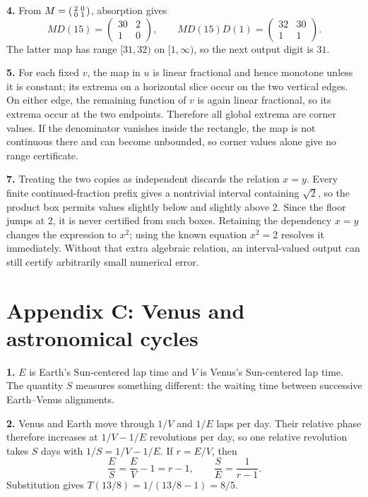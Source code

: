 \textbf{4.} From $M=\begin{psmallmatrix}2&0\\0&1\end{psmallmatrix}$,
absorption gives
\[
 MD(15)=\begin{pmatrix}30&2\\1&0\end{pmatrix},
 \qquad
 MD(15)D(1)=\begin{pmatrix}32&30\\1&1\end{pmatrix}.
\]
The latter map has range $[31,32)$ on $[1,\infty)$, so the next output digit
is $31$.

\textbf{5.} For each fixed $v$, the map in $u$ is linear fractional and hence
monotone unless it is constant; its extrema on a horizontal slice occur on the
two vertical edges.  On either edge, the remaining function of $v$ is again
linear fractional, so its extrema occur at the two endpoints.  Therefore all
global extrema are corner values.  If the denominator vanishes inside the
rectangle, the map is not continuous there and can become unbounded, so corner
values alone give no range certificate.

\textbf{7.} Treating the two copies as independent discards the relation
$x=y$.  Every finite continued-fraction prefix gives a nontrivial interval
containing $\sqrt2$, so the product box permits values slightly below and
slightly above $2$.  Since the floor jumps at $2$, it is never certified from
such boxes.  Retaining the dependency $x=y$ changes the expression to $x^2$;
using the known equation $x^2=2$ resolves it immediately.  Without that extra
algebraic relation, an interval-valued output can still certify arbitrarily
small numerical error.

\section*{Appendix C: Venus and astronomical cycles}

\textbf{1.} $E$ is Earth's Sun-centered lap time and $V$ is Venus's
Sun-centered lap time.  The quantity $S$ measures something different: the
waiting time between successive Earth--Venus alignments.

\textbf{2.} Venus and Earth move through $1/V$ and $1/E$ laps per day.
Their relative phase therefore increases at $1/V-1/E$ revolutions per day, so
one relative revolution takes $S$ days with $1/S=1/V-1/E$.  If $r=E/V$,
then
\[
  \frac ES=\frac EV-1=r-1,
  \qquad \frac SE=\frac1{r-1}.
\]
Substitution gives $T(13/8)=1/(13/8-1)=8/5$.


